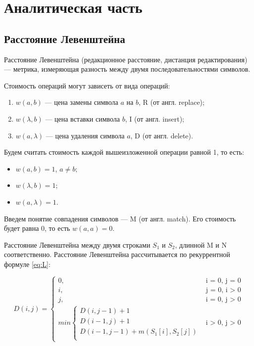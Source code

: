 \chapter{Аналитическая часть}
\section{Расстояние Левенштейна}

Расстояние Левенштейна \cite{levenshtein} (редакционное расстояние, дистанция редактирования) --- метрика, измеряющая разность между двумя последовательностями символов.

\noindent Стоимость операций могут зависеть от вида операций:
\begin{enumerate}
	\item $w(a, b)$ --- цена замены символа $a$ на $b$, R (от англ. replace);
	\item $w(\lambda, b)$ --- цена вставки символа $b$, I (от англ. insert);
	\item $w(a, \lambda)$ --- цена удаления символа $a$, D (от англ. delete).
\end{enumerate}

Будем считать стоимость каждой вышеизложенной операции равной 1, то есть:
\begin{itemize}
	\item $w(a, b) = 1$, $a \neq b$;
	\item $w(\lambda, b) = 1$;
	\item $w(a, \lambda) = 1$.
\end{itemize}

Введем понятие совпадения символов --- M (от англ. match). Его стоимость будет равна 0, то есть $w(a, a) = 0$.

Расстояние Левенштейна между двумя строками $S_{1}$ и $S_{2}$, длинной M и N соответственно. Расстояние Левенштейна рассчитывается по рекуррентной формуле \ref{eq:L}:

\begin{equation}
	\label{eq:L}
	D(i, j) =
	\begin{cases}
		0, &\text{i = 0, j = 0}\\
		i, &\text{j = 0, i > 0}\\
		j, &\text{i = 0, j > 0}\\
		min \begin{cases}
			D(i, j - 1) + 1\\
			D(i - 1, j) + 1\\
			D(i - 1, j - 1) +  m(S_{1}[i], S_{2}[j]) \\
		\end{cases}
		&\text{i > 0, j > 0}
	\end{cases}
\end{equation}

